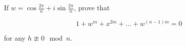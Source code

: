 If $w=\cos\frac{2\pi}{n}+i\sin\frac{2\pi}{n}$, prove that

$$1+w^m+x^{2m}+\ldots+w^{(n-1)m}=0$$

for any $h\ncong0\mod n$.